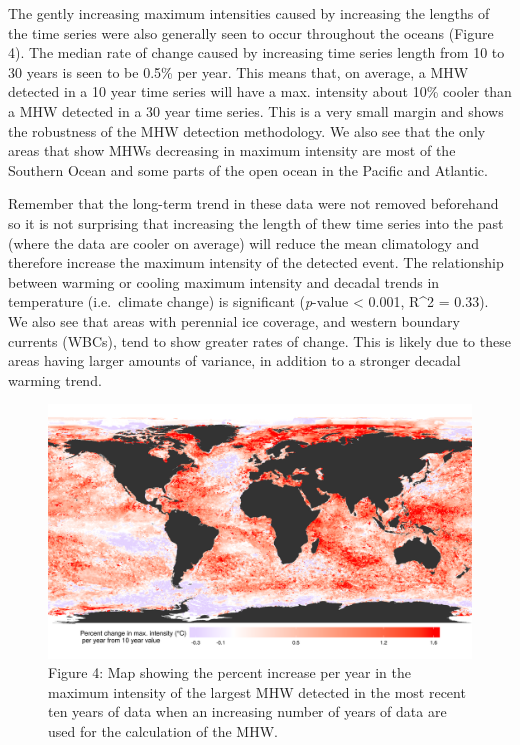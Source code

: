 \documentclass[utf8]{frontiersSCNS} %
\begin{document}
The gently increasing maximum intensities caused by increasing the
lengths of the time series were also generally seen to occur throughout
the oceans (Figure 4). The median rate of change caused by increasing
time series length from 10 to 30 years is seen to be 0.5\% per year.
This means that, on average, a MHW detected in a 10 year time series
will have a max. intensity about 10\% cooler than a MHW detected in a 30
year time series. This is a very small margin and shows the robustness
of the MHW detection methodology. We also see that the only areas that
show MHWs decreasing in maximum intensity are most of the Southern Ocean
and some parts of the open ocean in the Pacific and Atlantic.

Remember that the long-term trend in these data were not removed
beforehand so it is not surprising that increasing the length of thew
time series into the past (where the data are cooler on average) will
reduce the mean climatology and therefore increase the maximum intensity
of the detected event. The relationship between warming or cooling
maximum intensity and decadal trends in temperature (i.e.~climate
change) is significant (\emph{p}-value \textless{} 0.001, R\^{}2 =
0.33). We also see that areas with perennial ice coverage, and western
boundary currents (WBCs), tend to show greater rates of change. This is
likely due to these areas having larger amounts of variance, in addition
to a stronger decadal warming trend.

\begin{figure}
\centering
\includegraphics{../LaTeX/fig_4.png}
\caption{Figure 4: Map showing the percent increase per year in the
maximum intensity of the largest MHW detected in the most recent ten
years of data when an increasing number of years of data are used for
the calculation of the MHW.}
\end{figure}
\end{document}
